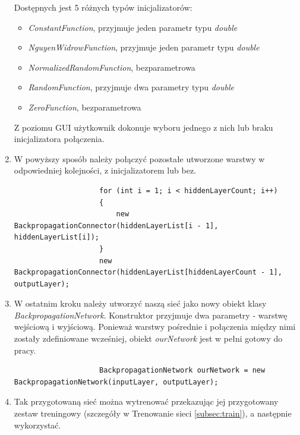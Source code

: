 \documentclass[a4paper]{article}
\begin{document}
\begin{enumerate}
\begin{lstlisting}
				\end{lstlisting}
				Dostępnych jest 5 różnych typów inicjalizatorów:
				\begin{itemize}
					\item \emph{ConstantFunction}, przyjmuje jeden parametr typu \textit{double}
					\item \emph{NguyenWidrowFunction}, przyjmuje jeden parametr typu \textit{double}
					\item \emph{NormalizedRandomFunction}, bezparametrowa
					\item \emph{RandomFunction}, przyjmuje dwa parametry typu \textit{double}
					\item \emph{ZeroFunction}, bezparametrowa
				\end{itemize}
				Z poziomu GUI użytkownik dokonuje wyboru jednego z nich lub braku inicjalizatora połączenia.
				\vfill
				\theendnotes
				\newpage
				\item W powyższy sposób należy połączyć pozostałe utworzone warstwy w odpowiedniej kolejności, z inicjalizatorem lub bez.
				\begin{lstlisting}
					for (int i = 1; i < hiddenLayerCount; i++)
					{
						new BackpropagationConnector(hiddenLayerList[i - 1], hiddenLayerList[i]);
					}
					new BackpropagationConnector(hiddenLayerList[hiddenLayerCount - 1], outputLayer);
				\end{lstlisting}
				\item W ostatnim kroku należy utworzyć naszą sieć jako nowy obiekt klasy \textit{BackpropagationNetwork}. Konstruktor przyjmuje dwa parametry - warstwę wejściową i wyjściową. Ponieważ warstwy pośrednie i połączenia między nimi zostały zdefiniowane wcześniej, obiekt \textit{ourNetwork} jest w pełni gotowy do pracy.
				\begin{lstlisting}
					BackpropagationNetwork ourNetwork = new BackpropagationNetwork(inputLayer, outputLayer);
				\end{lstlisting}
				\item Tak przygotowaną sieć można wytrenować przekazując jej przygotowany zestaw treningowy (szczegóły w Trenowanie sieci \ref{subsec:train}), a następnie wykorzystać.
			\end{enumerate}
\end{document}
